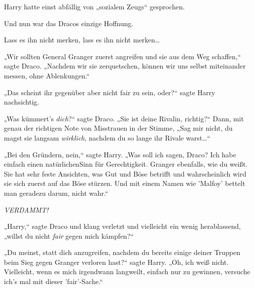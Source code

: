 Harry hatte einst abfällig von „sozialem Zeugs“ gesprochen.

Und nun war das Dracos einzige Hoffnung.

Lass es ihn nicht merken, lass es ihn nicht merken…

„Wir sollten General Granger zuerst angreifen und sie aus dem Weg schaffen,“ sagte Draco. „Nachdem wir sie zerquetschen, können wir uns selbst miteinander messen, ohne Ablenkungen.“

„Das scheint ihr gegenüber aber nicht fair zu sein, oder?“ sagte Harry nachsichtig.

„Was kümmert's \emph{dich}?“ sagte Draco. „Sie ist deine Rivalin, richtig?“ Dann, mit genau der richtigen Note von Misstrauen in der Stimme, „Sag mir nicht, du magst sie langsam \emph{wirklich}, nachdem du so lange ihr Rivale warst…“

„Bei den Gründern, nein,“ sagte Harry. „Was soll ich sagen, Draco? Ich habe einfach einen natürlichenSinn für Gerechtigkeit. Granger ebenfalls, wie du weißt. Sie hat sehr feste Ansichten, was Gut und Böse betrifft und wahrscheinlich wird sie sich zuerst auf das Böse stürzen. Und mit einem Namen wie 'Malfoy' bettelt man geradezu darum, nicht wahr.“

\emph{VERDAMMT!}

„Harry,“ sagte Draco und klang verletzt und vielleicht ein wenig herablassend, „willst du nicht \emph{fair} gegen mich kämpfen?“

„Du meinst, statt dich anzugreifen, nachdem du bereits einige deiner Truppen beim Sieg gegen Granger verloren hast?“ sagte Harry. „Oh, ich weiß nicht. Vielleicht, wenn es mich irgendwann langweilt, einfach nur zu gewinnen, versuche ich's mal mit dieser 'fair'-Sache.“

